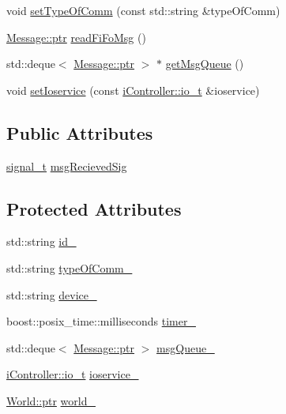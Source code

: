 \begin{DoxyCompactItemize}
void \hyperlink{classo_cpt_1_1i_comm_ad5b257586d4fb17bcdf075e2401312a6}{set\+Type\+Of\+Comm} (const std\+::string \&type\+Of\+Comm)
\item 
\hyperlink{structo_cpt_1_1i_comm_1_1_message_ad2ba828ad76f96a30e3898b2609a4c01}{Message\+::ptr} \hyperlink{classo_cpt_1_1i_comm_a888e17cd4719170d4cc533ec4eaf1271}{read\+Fi\+Fo\+Msg} ()
\item 
std\+::deque$<$ \hyperlink{structo_cpt_1_1i_comm_1_1_message_ad2ba828ad76f96a30e3898b2609a4c01}{Message\+::ptr} $>$ $\ast$ \hyperlink{classo_cpt_1_1i_comm_a6fdac5c5dad398d31adf177c900b8054}{get\+Msg\+Queue} ()
\item 
void \hyperlink{classo_cpt_1_1i_comm_a7f8322024fbcc1c7ef1fae87fc6aa368}{set\+Ioservice} (const \hyperlink{classo_cpt_1_1i_controller_a51c3436b03060209f6cd2ddce6df2d0c}{i\+Controller\+::io\+\_\+t} \&ioservice)
\end{DoxyCompactItemize}
\subsection*{Public Attributes}
\begin{DoxyCompactItemize}
\item 
\hyperlink{classo_cpt_1_1i_comm_a8226eab43e254e986c1645cb1c500ef7}{signal\+\_\+t} \hyperlink{classo_cpt_1_1i_comm_a575554cfd0889ae4d8920417e3c4ef55}{msg\+Recieved\+Sig}
\end{DoxyCompactItemize}
\subsection*{Protected Attributes}
\begin{DoxyCompactItemize}
\item 
std\+::string \hyperlink{classo_cpt_1_1i_comm_a65678a6bfb2da392d2932b0cd5d818c6}{id\+\_\+}
\item 
std\+::string \hyperlink{classo_cpt_1_1i_comm_a4805d3c40171aa763f029ebe1886e24f}{type\+Of\+Comm\+\_\+}
\item 
std\+::string \hyperlink{classo_cpt_1_1i_comm_a26b537ee10eb14c0a15bb2ad4c4b7cda}{device\+\_\+}
\item 
boost\+::posix\+\_\+time\+::milliseconds \hyperlink{classo_cpt_1_1i_comm_a1e9989bd934719256f4b50123825c00e}{timer\+\_\+}
\item 
std\+::deque$<$ \hyperlink{structo_cpt_1_1i_comm_1_1_message_ad2ba828ad76f96a30e3898b2609a4c01}{Message\+::ptr} $>$ \hyperlink{classo_cpt_1_1i_comm_aa4bc236cd4492ea8b4fd2481de58b43f}{msg\+Queue\+\_\+}
\item 
\hyperlink{classo_cpt_1_1i_controller_a51c3436b03060209f6cd2ddce6df2d0c}{i\+Controller\+::io\+\_\+t} \hyperlink{classo_cpt_1_1i_comm_a40e1c5e7d35a83973c1b913da9143a2f}{ioservice\+\_\+}
\item 
\hyperlink{classo_cpt_1_1_world_aa6e591e3096d5de71e0cec9039663d67}{World\+::ptr} \hyperlink{classo_cpt_1_1i_comm_a982de4fc52aa87006fc29a0b4667b231}{world\+\_\+}
\end{DoxyCompactItemize}


